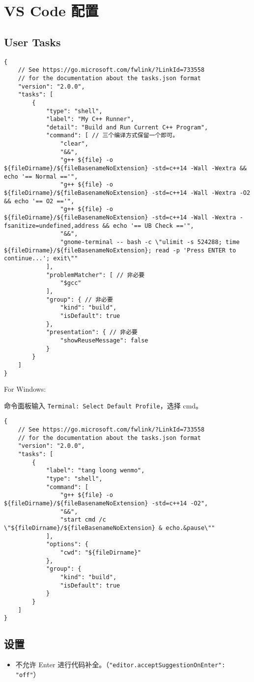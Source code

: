 \section{VS Code 配置}

\subsection{User Tasks}

\begin{verbatim}
{
    // See https://go.microsoft.com/fwlink/?LinkId=733558
    // for the documentation about the tasks.json format
    "version": "2.0.0",
    "tasks": [
        {
            "type": "shell",
            "label": "My C++ Runner",
            "detail": "Build and Run Current C++ Program",
            "command": [ // 三个编译方式保留一个即可。
                "clear",
                "&&",
                "g++ ${file} -o ${fileDirname}/${fileBasenameNoExtension} -std=c++14 -Wall -Wextra && echo '== Normal =='",
                "g++ ${file} -o ${fileDirname}/${fileBasenameNoExtension} -std=c++14 -Wall -Wextra -O2 && echo '== O2 =='",
                "g++ ${file} -o ${fileDirname}/${fileBasenameNoExtension} -std=c++14 -Wall -Wextra -fsanitize=undefined,address && echo '== UB Check =='",
                "&&",
                "gnome-terminal -- bash -c \"ulimit -s 524288; time ${fileDirname}/${fileBasenameNoExtension}; read -p 'Press ENTER to continue...'; exit\""
            ],
            "problemMatcher": [ // 非必要
                "$gcc"
            ],
            "group": { // 非必要
                "kind": "build",
                "isDefault": true
            },
            "presentation": { // 非必要
                "showReuseMessage": false
            }
        }
    ]
}
\end{verbatim}

For Windows:

命令面板输入 \lstinline|Terminal: Select Default Profile|，选择 cmd。

\begin{verbatim}
{
    // See https://go.microsoft.com/fwlink/?LinkId=733558
    // for the documentation about the tasks.json format
    "version": "2.0.0",
    "tasks": [
        {
            "label": "tang loong wenmo",
            "type": "shell",
            "command": [
                "g++ ${file} -o ${fileDirname}/${fileBasenameNoExtension} -std=c++14 -O2",
                "&&",
                "start cmd /c \"${fileDirname}/${fileBasenameNoExtension} & echo.&pause\""
            ],
            "options": {
                "cwd": "${fileDirname}"
            },
            "group": {
                "kind": "build",
                "isDefault": true
            }
        }
    ]
}
\end{verbatim}

\subsection{设置}

\begin{itemize}
    \item 不允许 Enter 进行代码补全。（\lstinline|"editor.acceptSuggestionOnEnter": "off"|）
\end{itemize}